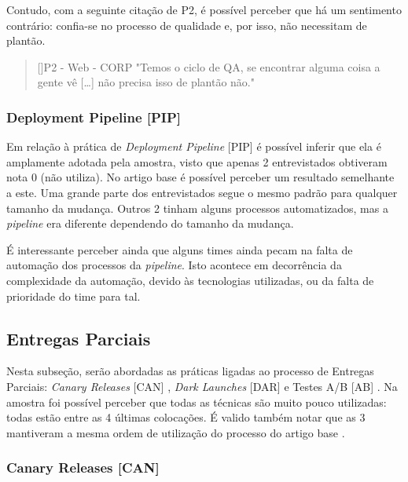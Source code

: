 Contudo, com a seguinte citação de P2, é possível perceber que há um sentimento contrário: confia-se no processo de qualidade e, por isso, não necessitam de plantão.

\vspace{5mm}

\begin{quotation}[]{P2 - Web - CORP}
    "Temos o ciclo de QA, se encontrar alguma coisa a gente vê […] não precisa isso de plantão não." 
\end{quotation}

\subsubsection{Deployment Pipeline [PIP]}

Em relação à prática de \emph{Deployment Pipeline} [PIP] é possível inferir que ela é amplamente adotada pela amostra, visto que apenas 2 entrevistados obtiveram nota 0 (não utiliza). No artigo base é possível perceber um resultado semelhante a este. Uma grande parte dos entrevistados segue o mesmo padrão para qualquer tamanho da mudança. Outros 2 tinham alguns processos automatizados, mas a \emph{pipeline} era diferente dependendo do tamanho da mudança.

É interessante perceber ainda que alguns times ainda pecam na falta de automação dos processos da \emph{pipeline}. Isto acontece em decorrência da complexidade da automação, devido às tecnologias utilizadas, ou da falta de prioridade do time para tal.
 
\subsection{Entregas Parciais}

Nesta subseção, serão abordadas as práticas ligadas ao processo de Entregas Parciais: \emph{Canary Releases} [CAN] \cite{continuousDeliveryBook}, \emph{Dark Launches} [DAR] \cite{devAndDeploymentFB} e Testes A/B [AB] \cite{testsAB}. Na amostra foi possível perceber que todas as técnicas são muito pouco utilizadas: todas estão entre as 4 últimas colocações. É valido também notar que as 3 mantiveram a mesma ordem de utilização do processo do artigo base \cite{empiricalStudy2016}.

\subsubsection{Canary Releases [CAN]}

